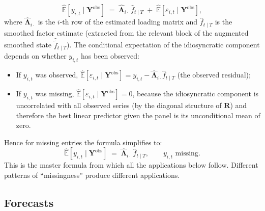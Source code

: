\documentclass[11pt, a4paper, oneside]{article}
\newcommand{\mL}{\boldsymbol{\Lambda}}
\begin{document}
\begin{equation}
\hat{\mathbb{E}}[y_{i,t} \mid \mathbf{Y}^{\mathrm{obs}}]
\;=\; \hat{\mL}_{i \cdot}\, \hat{f}_{t \mid T} \;+\; \hat{\mathbb{E}}[\varepsilon_{i,t} \mid \mathbf{Y}^{\mathrm{obs}}],
\label{eq:master-cond-exp}
\end{equation}
where $\hat{\mL}_{i \cdot}$ is the $i$-th row of the estimated loading
matrix and $\hat{f}_{t \mid T}$ is the smoothed factor estimate
(extracted from the relevant block of the augmented smoothed state
$\hat{\tilde{f}}_{t \mid T}$). The conditional expectation of the
idiosyncratic component depends on whether $y_{i,t}$ has been observed:
\begin{itemize}[leftmargin=1.5em, itemsep=2pt]
    \item If $y_{i,t}$ was observed,
          $\hat{\mathbb{E}}[\varepsilon_{i,t} \mid \mathbf{Y}^{\mathrm{obs}}] = y_{i,t} - \hat{\mL}_{i \cdot} \hat{f}_{t \mid T}$
          (the observed residual);
    \item If $y_{i,t}$ was missing,
          $\hat{\mathbb{E}}[\varepsilon_{i,t} \mid \mathbf{Y}^{\mathrm{obs}}] = 0$,
          because the idiosyncratic component is uncorrelated with all
          observed series (by the diagonal structure of $\mathbf{R}$)
          and therefore the best linear predictor given the panel is
          its unconditional mean of zero.
\end{itemize}
Hence for missing entries the formula simplifies to:
\begin{equation}
\hat{\mathbb{E}}[y_{i,t} \mid \mathbf{Y}^{\mathrm{obs}}]
\;=\; \hat{\mL}_{i \cdot}\, \hat{f}_{t \mid T},
\qquad y_{i,t}\text{ missing}.
\label{eq:cond-exp-missing}
\end{equation}
This is the master formula from which all the applications below
follow. Different patterns of ``missingness'' produce different
applications.

\subsection{Forecasts}
\end{document}
